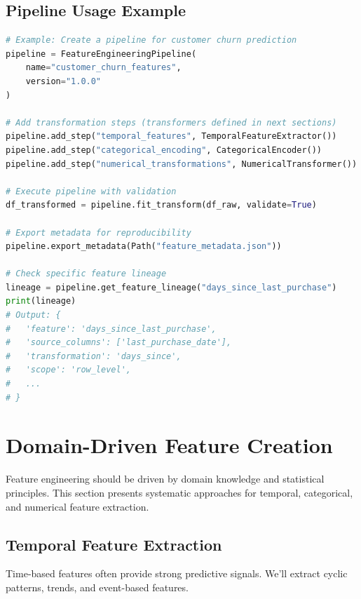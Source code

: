 \subsection{Pipeline Usage Example}

\begin{lstlisting}[language=Python, caption={Using the Feature Engineering Pipeline}]
# Example: Create a pipeline for customer churn prediction
pipeline = FeatureEngineeringPipeline(
    name="customer_churn_features",
    version="1.0.0"
)

# Add transformation steps (transformers defined in next sections)
pipeline.add_step("temporal_features", TemporalFeatureExtractor())
pipeline.add_step("categorical_encoding", CategoricalEncoder())
pipeline.add_step("numerical_transformations", NumericalTransformer())

# Execute pipeline with validation
df_transformed = pipeline.fit_transform(df_raw, validate=True)

# Export metadata for reproducibility
pipeline.export_metadata(Path("feature_metadata.json"))

# Check specific feature lineage
lineage = pipeline.get_feature_lineage("days_since_last_purchase")
print(lineage)
# Output: {
#   'feature': 'days_since_last_purchase',
#   'source_columns': ['last_purchase_date'],
#   'transformation': 'days_since',
#   'scope': 'row_level',
#   ...
# }
\end{lstlisting}

\section{Domain-Driven Feature Creation}

Feature engineering should be driven by domain knowledge and statistical principles. This section presents systematic approaches for temporal, categorical, and numerical feature extraction.

\subsection{Temporal Feature Extraction}

Time-based features often provide strong predictive signals. We'll extract cyclic patterns, trends, and event-based features.

